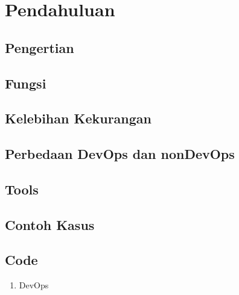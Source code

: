 \chapter{Pendahuluan}
\author{Alfa Yohannis, Charlie Chaplin}

\section{Pengertian}
\section{Fungsi}
\section{Kelebihan Kekurangan}
\section{Perbedaan DevOps dan nonDevOps}
\section{Tools}
\section{Contoh Kasus}
\section{Code}
\begin{enumerate}
	\item DevOps
\end{enumerate}